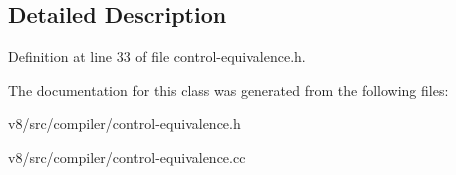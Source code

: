 \subsection{Detailed Description}


Definition at line 33 of file control-\/equivalence.\+h.



The documentation for this class was generated from the following files\+:\begin{DoxyCompactItemize}
\item 
v8/src/compiler/control-\/equivalence.\+h\item 
v8/src/compiler/control-\/equivalence.\+cc\end{DoxyCompactItemize}
